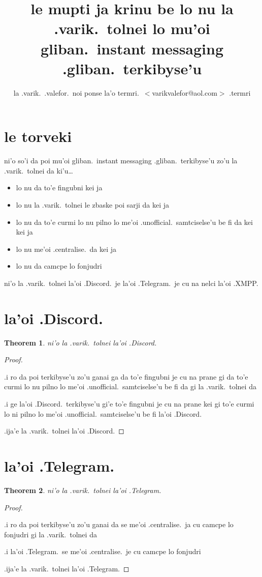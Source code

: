 \documentclass{article}
\title{le mupti ja krinu be lo nu la .varik.\ tolnei lo mu'oi gliban.\ instant messaging .gliban.\ terkibyse'u}
\author{la .varik.\ .valefor.\ noi ponse la'o termri.\ $<$varikvalefor@aol.com$>$ .termri}
\newtheorem{thm}{Theorem}
\begin{document}
\maketitle

\section{le torveki}
ni'o so'i da poi mu'oi gliban.\ instant messaging .gliban.\ terkibyse'u zo'u la .varik.\ tolnei da ki'u\ldots
\begin{itemize}
	\item lo nu da to'e fingubni kei ja
	\item lo nu la .varik.\ tolnei le zbaske poi sarji da kei ja
	\item lo nu da to'e curmi lo nu pilno lo me'oi .unofficial.\ samtciselse'u be fi da kei kei ja
	\item lo nu me'oi .centralise.\ da kei ja
	\item lo nu da camcpe lo fonjudri
\end{itemize}

ni'o la .varik.\ tolnei la'oi .Discord.\ je la'oi .Telegram.\ je cu na nelci la'oi .XMPP.
\section{la'oi .Discord.}
\begin{thm}
	ni'o la .varik.\ tolnei la'oi .Discord.
\end{thm}
\begin{proof}
	${}$

	.i ro da poi terkibyse'u zo'u ganai ga da to'e fingubni je cu na prane gi da to'e curmi lo nu pilno lo me'oi .unofficial.\ samtciselse'u be fi da gi la .varik.\ tolnei da

	.i ge la'oi .Discord.\ terkibyse'u gi'e to'e fingubni je cu na prane kei gi to'e curmi lo ni pilno lo me'oi .unofficial.\ samtciselse'u be fi la'oi .Discord.

	.ija'e la .varik.\ tolnei la'oi .Discord.
\end{proof}

\section{la'oi .Telegram.}
\begin{thm}
	ni'o la .varik.\ tolnei la'oi .Telegram.
\end{thm}
\begin{proof}
	${}$

	.i ro da poi terkibyse'u zo'u ganai da se me'oi .centralise.\ ja cu camcpe lo fonjudri gi la .varik.\ tolnei da

	.i la'oi .Telegram.\ se me'oi .centralise.\ je cu camcpe lo fonjudri

	.ija'e la .varik.\ tolnei la'oi .Telegram.
\end{proof}
\end{document}
